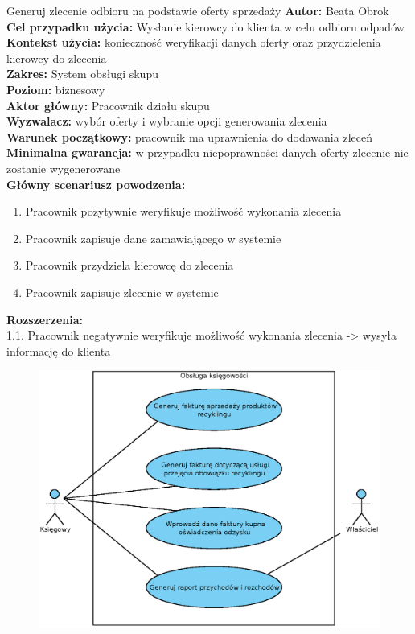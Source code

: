 \begin{usecase}{Generuj zlecenie odbioru na podstawie oferty sprzedaży}
	\textbf{Autor:} Beata Obrok \\
	\textbf{Cel przypadku użycia:} Wysłanie kierowcy do klienta w celu odbioru odpadów \\
	\textbf{Kontekst użycia:} konieczność weryfikacji danych oferty oraz przydzielenia kierowcy do zlecenia \\
	\textbf{Zakres:} System obsługi skupu \\
	\textbf{Poziom:} biznesowy \\
	\textbf{Aktor główny:} Pracownik działu skupu\\
	\textbf{Wyzwalacz:} wybór oferty i wybranie opcji generowania zlecenia \\
	\textbf{Warunek początkowy:} pracownik ma uprawnienia do dodawania zleceń \\
	\textbf{Minimalna gwarancja:} w przypadku niepoprawności danych oferty zlecenie nie zostanie wygenerowane \\
	\textbf{Główny scenariusz powodzenia:} \\
		\begin{enumerate}
			\item Pracownik pozytywnie weryfikuje możliwość wykonania zlecenia
			\item Pracownik zapisuje dane zamawiającego w systemie
			\item Pracownik przydziela kierowcę do zlecenia
			\item Pracownik zapisuje zlecenie w systemie
		\end{enumerate}
	\textbf{Rozszerzenia:} \\
			1.1. Pracownik negatywnie weryfikuje możliwość wykonania zlecenia -> wysyła informację do klienta
\end{usecase}

\begin{figure}[H]
	\centering
	\includegraphics[width=\textwidth]{img/UC/ksiegowosc.eps}
\end{figure}

